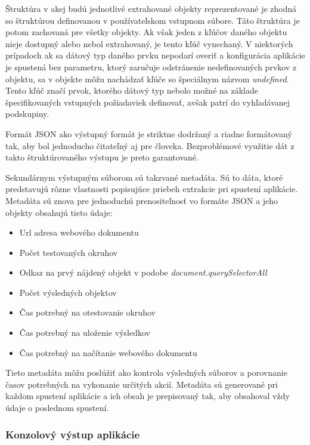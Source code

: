 \bigskip

Štruktúra v akej budú jednotlivé extrahované objekty reprezentované je zhodná so štruktúrou definovanou v používateľskom vstupnom súbore. Táto štruktúra je potom zachovaná pre všetky objekty. Ak však jeden z kľúčov daného objektu nieje dostupný alebo nebol extrahovaný, je tento kľúč vynechaný. V niektorých prípadoch ak sa dátový typ daného prvku nepodarí overiť a konfigurácia aplikácie je spustená bez parametru, ktorý zaručuje odstránenie nedefinovaných prvkov z objektu, sa v objekte môžu nachádzať kľúče so špeciálnym názvom \textit{undefined}. Tento kľúč značí prvok, ktorého dátový typ nebolo možné na základe špecifikovaných vstupných požiadaviek definovať, avšak patrí do vyhľadávanej podskupiny.

Formát JSON ako výstupný formát je striktne dodržaný a riadne formátovaný tak, aby bol jednoducho čitateľný aj pre človeka. Bezproblémové využitie dát z takto štruktúrovaného výstupu je preto garantované.

\bigskip

Sekundárnym výstupným súborom sú takzvané metadáta. Sú to dáta, ktoré predstavujú rôzne vlastnosti popisujúce priebeh extrakcie pri spustení aplikácie. Metadáta sú znova pre jednoduchú prenositeľnosť vo formáte JSON a jeho objekty obsahujú tieto údaje:

\begin{itemize}
    \item {Url adresa webového dokumentu}
    \item {Počet testovaných okruhov}
    \item {Odkaz na prvý nájdený objekt v podobe \textit{document.querySelectorAll}}
    \item {Počet výsledných objektov}
    \item {Čas potrebný na otestovanie okruhov}
    \item {Čas potrebný na uloženie výsledkov}
    \item {Čas potrebný na načítanie webového dokumentu}
\end{itemize}

\bigskip

Tieto metadáta môžu poslúžiť ako kontrola výsledných súborov a porovnanie časov potrebných na vykonanie určitých akcií. Metadáta sú generované pri každom spustení aplikácie a ich obsah je prepisovaný tak, aby obsahoval vždy údaje o poslednom spustení.


\subsubsection{Konzolový výstup aplikácie}

